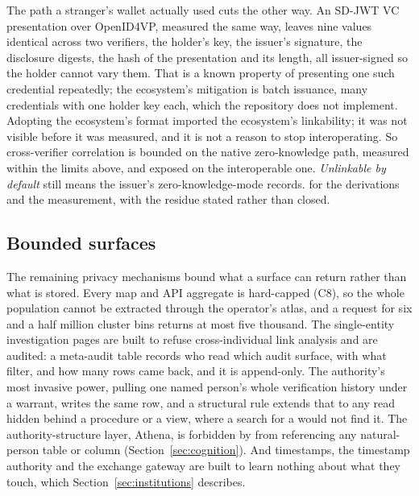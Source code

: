 The path a stranger's wallet actually used cuts the other way. An SD-JWT VC presentation over
OpenID4VP, measured the same way, leaves nine values identical across two verifiers, the holder's
key, the issuer's signature, the disclosure digests, the hash of the presentation and its length,
all issuer-signed so the holder cannot vary them. That is a known property of presenting one such
credential repeatedly; the ecosystem's mitigation is batch issuance, many credentials with one holder
key each, which the repository does not implement. Adopting the ecosystem's format imported the
ecosystem's linkability; it was not visible before it was measured, and it is not a reason to stop
interoperating. So cross-verifier correlation is bounded on the native zero-knowledge path,
measured within the limits above, and exposed on the interoperable one. \emph{Unlinkable by
default} still means the issuer's zero-knowledge-mode records. \sImplMark{} for the derivations and the
measurement, with the residue stated rather than closed.

\subsection{Bounded surfaces}

The remaining privacy mechanisms bound what a surface can return rather than what is stored. Every
map and API aggregate is hard-capped (C8), so the whole population cannot be extracted through the
operator's atlas, and a request for six and a half million cluster bins returns at most five
thousand. The single-entity investigation pages are built to refuse cross-individual link analysis
and are audited: a meta-audit table records who read which audit surface, with what filter, and how
many rows came back, and it is append-only. The authority's most invasive power, pulling one named
person's whole verification history under a warrant, writes the same row, and a structural rule
extends that to any read hidden behind a procedure or a view, where a search for a 
would not find it. The authority-structure layer, Athena, is forbidden by
 from referencing any natural-person table or column (Section~\ref{sec:cognition}). And
timestamps, the timestamp authority and the exchange gateway are built to learn nothing about what
they touch, which Section~\ref{sec:institutions} describes. \sImpl

